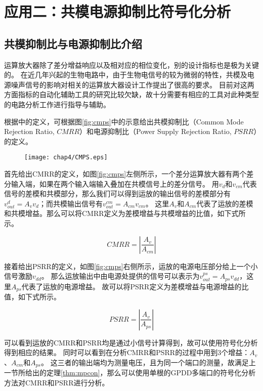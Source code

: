 \section{应用二：共模电源抑制比符号化分析}

\subsection{共模抑制比与电源抑制比介绍}

运算放大器除了差分增益响应以及相对应的相位变化，别的设计指标也是极为关键的。
在近几年兴起的生物电路中，由于生物电信号的较为微弱的特性，共模及电源噪声信号的影响对相关的运算放大器设计工作提出了很高的要求\parencite{Sawan-CMRR-1999,Abdullah-Biopotential-2015,Paul-22dBPSRR-2012}。
目前对这两方面指标的自动化辅助工具的研究比较欠缺，故十分需要有相应的工具对此种类型的电路分析工作进行指导与辅助。

根据\parencite{GRAY-Analog}中的定义，可根据图\ref{fig:cmps}中的示意给出共模抑制比（Common Mode Rejection Ratio, $CMRR$）和电源抑制比（Power Supply Rejection Ratio, $PSRR$）的定义。

\begin{figure}[!htp]
	\centering
	\texttt{[image: chap4/CMPS.eps]}
\end{figure}

首先给出CMRR的定义，如图\ref{fig:cmps}左侧所示，一个差分运算放大器有两个差分输入端，如果在两个输入端输入叠加在共模信号上的差分信号。
用$v_d$和$v_{cm}$代表信号的差模和共模部分，那么我们可以得到运放的输出信号的差模部分有$v_{out}^{d} = A_v v_d$；而共模输出信号有$v_{out}^{cm} = A_{cm} v_{cm}$。
这里$A_v$和$A_{cm}$代表了运放的差模和共模增益。那么可以将CMRR定义为差模增益与共模增益的比值，如下式所示。

\begin{equation}
CMRR = \left|\frac{A_v}{A_{cm}}\right|
\end{equation}

接着给出PSRR的定义，如图\ref{fig:cmps}右侧所示，运放的电源电压部分给上一个小信号激励$v_{dd}$。
那么运放输出中由电源处提供的信号可以表示为$v_{out}^{ps} = A_{ps}v_{dd}$，这里$A_{ps}$代表了运放的电源增益。
故可以将PSRR定义为差模增益与电源增益的比值，如下式所示。

\begin{equation}
PSRR = \left|\frac{A_v}{A_{ps}}\right|
\end{equation}

可以看到运放的CMRR和PSRR均是通过小信号计算得到，故可以使用符号化分析得到相应的结果。
同时可以看到在分析CMRR和PSRR的过程中用到3个增益：$A_v$、$A_{cm}$和$A_{ps}$。
这三者的输出端均为测量电压，且为同一个端口的测量，故满足上一节所给出的定理\ref{thm:mpcon}，那么可以使用单根的GPDD多端口的符号化分析方法对CMRR和PSRR进行分析。

